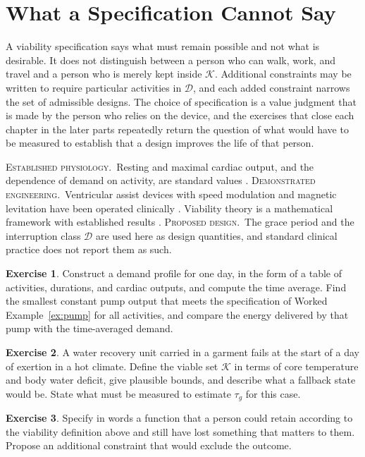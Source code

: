 \documentclass[11pt,openany]{book}
\theoremstyle{definition}
\newtheorem{exercise}{Exercise}[chapter]
\theoremstyle{remark}
\newcommand{\est}{\textsc{Established physiology.}\ }
\newcommand{\dem}{\textsc{Demonstrated engineering.}\ }
\newcommand{\pro}{\textsc{Proposed design.}\ }
\newcommand{\Kset}{\mathcal{K}}
\newcommand{\Dset}{\mathcal{D}}
\begin{document}
\section{What a Specification Cannot Say}

A viability specification says what must remain possible and not what is desirable. It does not distinguish between a person who can walk, work, and travel and a person who is merely kept inside $\Kset$. Additional constraints may be written to require particular activities in $\Dset$, and each added constraint narrows the set of admissible designs. The choice of specification is a value judgment that is made by the person who relies on the device, and the exercises that close each chapter in the later parts repeatedly return the question of what would have to be measured to establish that a design improves the life of that person.

\begin{evidence}
\est Resting and maximal cardiac output, and the dependence of demand on activity, are standard values \cite{guyton2021}. \dem Ventricular assist devices with speed modulation and magnetic levitation have been operated clinically \cite{mehra2017}. Viability theory is a mathematical framework with established results \cite{aubin1991}. \pro The grace period and the interruption class $\Dset$ are used here as design quantities, and standard clinical practice does not report them as such.
\end{evidence}

\begin{exercise}
Construct a demand profile for one day, in the form of a table of activities, durations, and cardiac outputs, and compute the time average. Find the smallest constant pump output that meets the specification of Worked Example~\ref{ex:pump} for all activities, and compare the energy delivered by that pump with the time-averaged demand.
\end{exercise}

\begin{exercise}
A water recovery unit carried in a garment fails at the start of a day of exertion in a hot climate. Define the viable set $\Kset$ in terms of core temperature and body water deficit, give plausible bounds, and describe what a fallback state would be. State what must be measured to estimate $\tau_g$ for this case.
\end{exercise}

\begin{exercise}
Specify in words a function that a person could retain according to the viability definition above and still have lost something that matters to them. Propose an additional constraint that would exclude the outcome.
\end{exercise}
\end{document}
